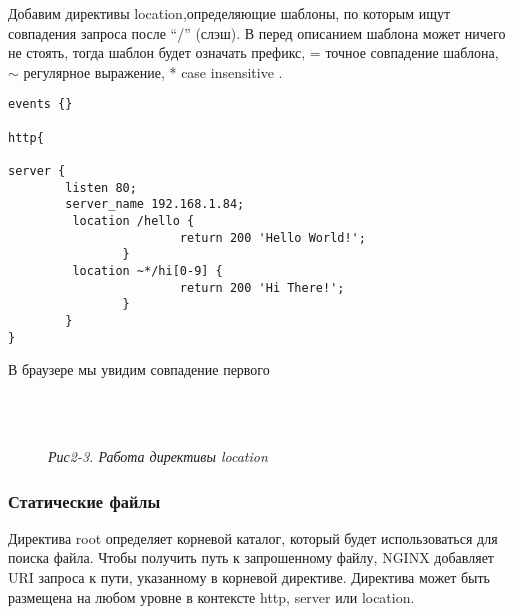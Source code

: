 \documentclass[14pt, a4paper]{article}
\begin{document}
Добавим директивы \colorbox{backcolour}{location},определяющие шаблоны, по которым ищут совпадения запроса после
“/” (слэш). В перед описанием шаблона может ничего не стоять, тогда шаблон будет означать
префикс, = точное совпадение шаблона, $\sim$ регулярное выражение, * case insensitive .

\vspace{0.3cm}
\begin{lstlisting}
events {}

http{

server {
        listen 80;
        server_name 192.168.1.84;
         location /hello {
                        return 200 'Hello World!';
                }
         location ~*/hi[0-9] {
                        return 200 'Hi There!';
                }
        }
}
\end{lstlisting}
\vspace{0.2cm}

В браузере мы увидим совпадение первого


\begin{figure}[h]
    \centering
    \\ 
    \label{framework} 
\end{figure}

\newpage

\begin{figure}[h]
    \centering
    \\ 
    \small\textit{Рис2-3. Работа директивы location}   
    \label{framework} 
\end{figure}

\subsubsection*{Статические файлы} 

Директива \colorbox{backcolour}{root} определяет корневой каталог, который будет использоваться для поиска файла.
Чтобы получить путь к запрошенному файлу, NGINX добавляет URI запроса к пути, указанному в
корневой директиве. Директива может быть размещена на любом уровне в контексте \colorbox{backcolour}{http}, \colorbox{backcolour}{server}
или \colorbox{backcolour}{location}.
\end{document}
